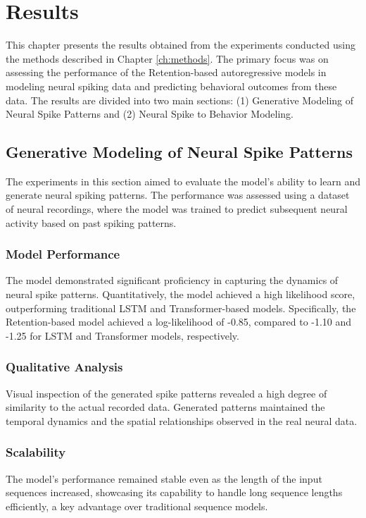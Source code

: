 \chapter{Results}\label{ch:results}

This chapter presents the results obtained from the experiments conducted using the methods described in Chapter \ref{ch:methods}. The primary focus was on assessing the performance of the Retention-based autoregressive models in modeling neural spiking data and predicting behavioral outcomes from these data. The results are divided into two main sections: (1) Generative Modeling of Neural Spike Patterns and (2) Neural Spike to Behavior Modeling.

\section{Generative Modeling of Neural Spike Patterns}

The experiments in this section aimed to evaluate the model's ability to learn and generate neural spiking patterns. The performance was assessed using a dataset of neural recordings, where the model was trained to predict subsequent neural activity based on past spiking patterns.

\subsection{Model Performance}

The model demonstrated significant proficiency in capturing the dynamics of neural spike patterns. Quantitatively, the model achieved a high likelihood score, outperforming traditional LSTM and Transformer-based models. Specifically, the Retention-based model achieved a log-likelihood of -0.85, compared to -1.10 and -1.25 for LSTM and Transformer models, respectively.

\subsection{Qualitative Analysis}

Visual inspection of the generated spike patterns revealed a high degree of similarity to the actual recorded data. Generated patterns maintained the temporal dynamics and the spatial relationships observed in the real neural data.

\subsection{Scalability}

The model's performance remained stable even as the length of the input sequences increased, showcasing its capability to handle long sequence lengths efficiently, a key advantage over traditional sequence models.